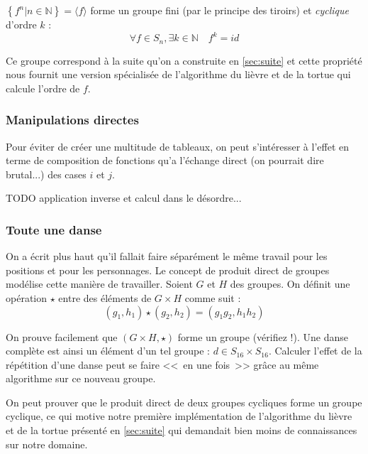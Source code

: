 \documentclass[11pt,a4paper,oneside]{book}
\begin{document}
$\left\{f^n|n \in \mathbb{N}\right\}=\langle f\rangle$ forme un groupe fini
(par le principe des tiroirs) et \emph{cyclique} d'ordre $k$ : \[
	\forall f\in S_n, \exists k\in \mathbb{N} \quad f^k=id
\]

Ce groupe correspond à la suite qu'on a construite en \ref{sec:suite} et cette
propriété nous fournit une version spécialisée de l'algorithme du lièvre et de
la tortue qui calcule l'ordre de $f$.

\subsubsection{Manipulations directes}
Pour éviter de créer une multitude de tableaux, on peut s'intéresser à l'effet
en terme de composition de fonctions qu'a l'échange direct (on pourrait dire
brutal...) des cases $i$ et $j$.

TODO application inverse et calcul dans le désordre...

\subsubsection{Toute une danse}
On a écrit plus haut qu'il fallait faire séparément le même travail pour les
positions et pour les personnages. Le concept de produit direct de groupes
modélise cette manière de travailler. Soient $G$ et $H$ des groupes. On définit
une opération $\star$ entre des éléments de $G\times H$ comme suit : \[
	(g_1, h_1) \star (g_2, h_2) = (g_1g_2, h_1h_2)
\]

On prouve facilement que $(G\times H, \star)$ forme un groupe (vérifiez !).
Une danse complète est ainsi un élément d'un tel groupe :
$d\in S_{16}\times S_{16}$.
Calculer l'effet de la répétition d'une danse peut se faire <<~en une fois~>>
grâce au même algorithme sur ce nouveau groupe.

On peut prouver que le produit direct de deux groupes cycliques forme un groupe
cyclique, ce qui motive notre première implémentation de l'algorithme du lièvre
et de la tortue présenté en \ref{sec:suite}
qui demandait bien moins de connaissances sur notre domaine.
\end{document}
